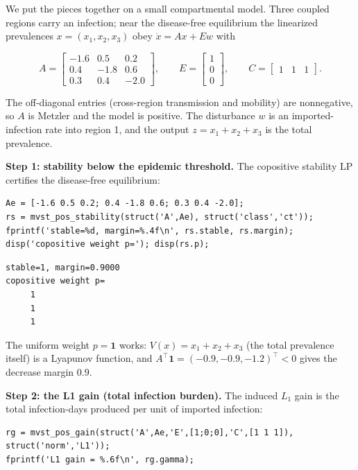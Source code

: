 \documentclass[11pt,oneside]{report}
\begin{document}
We put the pieces together on a small compartmental model. Three coupled regions
carry an infection; near the disease-free equilibrium the linearized prevalences
\(x = (x_1, x_2, x_3)\) obey \(\dot x = A x + E w\) with

\[
A = \begin{bmatrix} -1.6 & 0.5 & 0.2 \\ 0.4 & -1.8 & 0.6 \\ 0.3 & 0.4 & -2.0 \end{bmatrix},
\qquad E = \begin{bmatrix} 1 \\ 0 \\ 0 \end{bmatrix},
\qquad C = \begin{bmatrix} 1 & 1 & 1 \end{bmatrix} .
\]

The off-diagonal entries (cross-region transmission and mobility) are
nonnegative, so \(A\) is Metzler and the model is positive. The disturbance \(w\) is
an imported-infection rate into region 1, and the output \(z = x_1 + x_2 + x_3\) is
the total prevalence.

\textbf{Step 1: stability below the epidemic threshold.} The copositive stability LP
certifies the disease-free equilibrium:

\begin{lstlisting}[style=matlabstyle]
Ae = [-1.6 0.5 0.2; 0.4 -1.8 0.6; 0.3 0.4 -2.0];
rs = mvst_pos_stability(struct('A',Ae), struct('class','ct'));
fprintf('stable=%d, margin=%.4f\n', rs.stable, rs.margin);
disp('copositive weight p='); disp(rs.p);
\end{lstlisting}

\begin{lstlisting}[style=outputstyle]
stable=1, margin=0.9000
copositive weight p=
     1
     1
     1
\end{lstlisting}

The uniform weight \(p = \mathbf 1\) works: \(V(x) = x_1 + x_2 + x_3\) (the total
prevalence itself) is a Lyapunov function, and \(A^\top \mathbf 1 = (-0.9, -0.9, -1.2)^\top < 0\) gives the decrease margin \(0.9\).

\textbf{Step 2: the L1 gain (total infection burden).} The induced \(L_1\) gain is the
total infection-days produced per unit of imported infection:

\begin{lstlisting}[style=matlabstyle]
rg = mvst_pos_gain(struct('A',Ae,'E',[1;0;0],'C',[1 1 1]), struct('norm','L1'));
fprintf('L1 gain = %.6f\n', rg.gamma);
\end{lstlisting}
\end{document}
